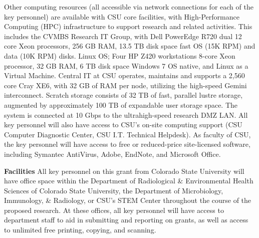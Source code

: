 \documentclass[pdftex,english,11pt,parskip=half]{scrartcl}
\begin{document}
Other computing resources (all accessible via network connections for each
of the key personnel) are available with CSU core facilities, with
High-Performance Computing (HPC) infrastructure to support research and
related activities. This includes the CVMBS Research IT Group, with Dell
PowerEdge R720 dual 12 core Xeon processors, 256 GB RAM, 13.5 TB disk space
fast OS (15K RPM) and data (10K RPM) disks.  Linux OS; Four HP Z420
workstations 8-core Xeon
processor, 32 GB RAM, 6 TB disk space Windows 7 OS native, and Linux as a
Virtual Machine.  Central IT at CSU operates, maintains and supports a 2,560 core Cray XE6, with 32 GB of RAM per node, utilizing the high-speed Gemini interconnect. Scratch storage consists of 32 TB of fast, parallel lustre storage, augmented by approximately 100 TB of expandable user storage space. The system is connected at 10 Gbps to the ultrahigh-speed research DMZ LAN. All key personnel will also have access to CSU’s on-site computing support (CSU Computer Diagnostic Center, CSU I.T. Technical Helpdesk). As faculty of CSU, the key personnel will have access to free or reduced-price site-licensed software, including Symantec AntiVirus, Adobe, EndNote, and Microsoft Office.


\textbf{Facilities} All key personnel on this grant from Colorado State University will have office space within the Department of Radiological \& Environmental Health Sciences of Colorado State University, the Department of Microbiology, Immunology, \& Radiology, or CSU's STEM Center throughout the course of the proposed research. At these offices, all key personnel will have access to department staff to aid in submitting and reporting on grants, as well as access to unlimited free printing, copying, and scanning.
\end{document}
